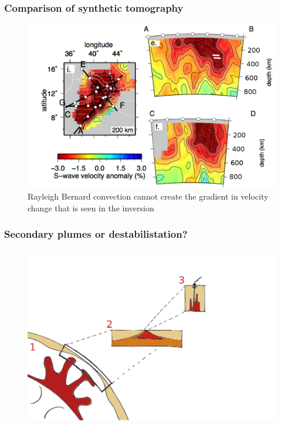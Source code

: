 \documentclass[aspectratio=169]{beamer}
\begin{document}
\begin{frame}
    \frametitle{Comparison of synthetic tomography}
    \begin{figure}
        \includegraphics[height=0.7\paperheight]{./figures/chiara1.png}
        \caption{Rayleigh Bernard convection cannot create the gradient in velocity change that is seen in the inversion}
    \end{figure}
\end{frame}

\begin{frame}
    \frametitle{Secondary plumes or destabilistation?}
    \begin{figure}
        \includegraphics[height=0.9\paperheight]{./pictures/drawing.png}
    \end{figure}
\end{frame}
\end{document}
